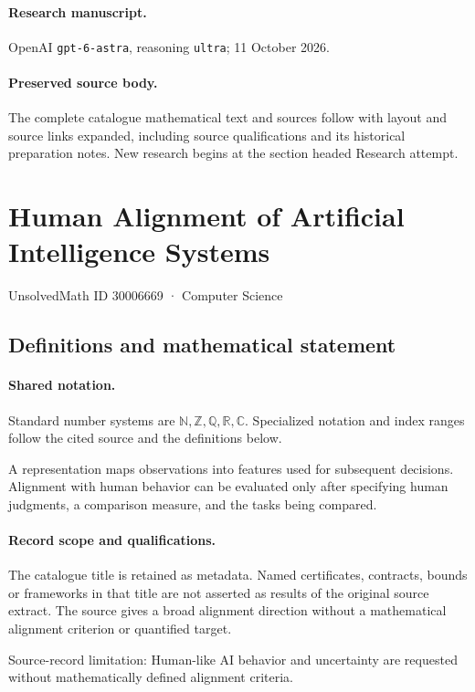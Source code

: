\documentclass[11pt]{article}
\begin{document}
\paragraph{Research manuscript.} OpenAI \texttt{gpt-6-astra}, reasoning \texttt{ultra}; 11 October 2026.
\paragraph{Preserved source body.} The complete catalogue mathematical text and sources follow with layout and source links expanded, including source qualifications and its historical preparation notes. New research begins at the section headed Research attempt.

\section{Human Alignment of Artificial Intelligence Systems}\label{30006669}
{\small UnsolvedMath ID 30006669 · Computer Science}
\subsection{Definitions and mathematical statement}

\paragraph{Shared notation.}Standard number systems are $\mathbb N,\mathbb Z,\mathbb Q,\mathbb R,\mathbb C$. Specialized notation and index ranges follow the cited source and the definitions below.


A representation maps observations into features used for subsequent decisions. Alignment with human behavior can be evaluated only after specifying human judgments, a comparison measure, and the tasks being compared.
\paragraph{Record scope and qualifications.}
The catalogue title is retained as metadata. Named certificates, contracts, bounds or frameworks in that title are not asserted as results of the original source extract.
The source gives a broad alignment direction without a mathematical alignment criterion or quantified target.

Source-record limitation: Human-like AI behavior and uncertainty are requested without mathematically defined alignment criteria.
\end{document}
